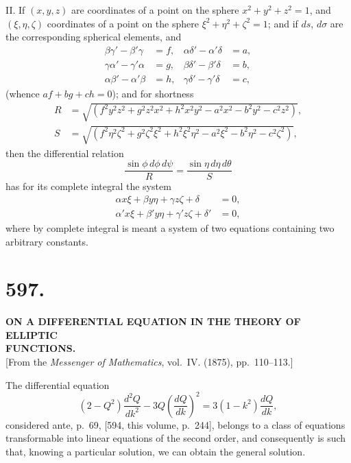 \documentclass[11pt,a4paper]{article}
\begin{document}
\medskip
\noindent\textsc{II.}\quad
If $(x,y,z)$ are coordinates of a point on the sphere $x^2+y^2+z^2=1$, and
$(\xi,\eta,\zeta)$ coordinates of a point on the sphere
$\xi^2+\eta^2+\zeta^2=1$; and if $ds$, $d\sigma$ are the corresponding
spherical elements, and
\begin{align*}
\beta\gamma'-\beta'\gamma &= f, & \alpha\delta'-\alpha'\delta &= a, \\
\gamma\alpha'-\gamma'\alpha &= g, & \beta\delta'-\beta'\delta &= b, \\
\alpha\beta'-\alpha'\beta &= h, & \gamma\delta'-\gamma'\delta &= c,
\end{align*}
(whence $af+bg+ch=0$); and for shortness
\begin{align*}
R &= \sqrt{(f^2y^2z^2+g^2z^2x^2+h^2x^2y^2-a^2x^2-b^2y^2-c^2z^2)},\\
S &= \sqrt{(f^2\eta^2\zeta^2+g^2\zeta^2\xi^2+h^2\xi^2\eta^2
       -a^2\xi^2-b^2\eta^2-c^2\zeta^2)},
\end{align*}
then the differential relation
\[
\frac{\sin\phi\,d\phi\,d\psi}{R}
  = \frac{\sin\eta\,d\eta\,d\theta}{S}
\]
has for its complete integral the system
\begin{align*}
\alpha x\xi + \beta y\eta + \gamma z\zeta + \delta &= 0,\\
\alpha' x\xi + \beta' y\eta + \gamma' z\zeta + \delta' &= 0,
\end{align*}
where by complete integral is meant a system of two equations containing two
arbitrary constants.

\newpage
\section*{597.}
\begin{center}
{\large\bfseries ON A DIFFERENTIAL EQUATION IN THE THEORY OF ELLIPTIC\\
FUNCTIONS.}\\[0.5em]
[From the \textit{Messenger of Mathematics}, vol.~IV. (1875), pp.~110--113.]
\end{center}

The differential equation
\[
(2-Q^2)\frac{d^2Q}{dk^2} - 3Q\left(\frac{dQ}{dk}\right)^2
  = 3(1-k^2)\frac{dQ}{dk},
\]
considered ante, p.~69, [594, this volume, p.~244], belongs to a class of
equations transformable into linear equations of the second order, and
consequently is such that, knowing a particular solution, we can obtain the
general solution.
\end{document}
